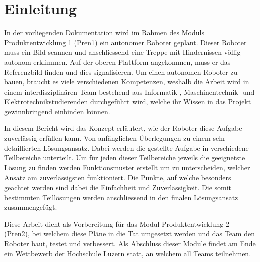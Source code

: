 \section{Einleitung}





In der vorliegenden Dokumentation wird im Rahmen des Moduls Produktentwicklung 1 (Pren1) ein autonomer Roboter geplant. Dieser Roboter muss ein Bild scannen und anschliessend eine Treppe mit Hindernissen völlig autonom erklimmen. Auf der oberen Plattform angekommen, muss er das Referenzbild finden und dies signalisieren.
Um einen autonomen Roboter zu bauen, braucht es viele verschiedenen Kompetenzen, weshalb die Arbeit wird in einem interdisziplinären Team bestehend aus Informatik-, Maschinentechnik- und Elektrotechnikstudierenden durchgeführt wird, welche ihr Wissen in das Projekt gewinnbringend einbinden können.

In diesem Bericht wird das Konzept erläutert, wie der Roboter diese Aufgabe zuverlässig erfüllen kann. Von anfänglichen Überlegungen zu einem sehr detaillierten Lösungsansatz. Dabei werden die gestellte Aufgabe in verschiedene Teilbereiche unterteilt. Um für jeden dieser Teilbereiche jeweils die geeignetste Lösung zu finden werden Funktionsmuster erstellt um zu unterscheiden, welcher Ansatz am zuverlässigsten funktioniert. Die Punkte, auf welche besonders geachtet werden sind dabei die Einfachheit und Zuverlässigkeit.
Die somit bestimmten Teillösungen werden anschliessend in den finalen Lösungsansatz zusammengefügt. 

Diese Arbeit dient als Vorbereitung für das Modul Produktentwicklung 2 (Pren2), bei welchem diese Pläne in die Tat umgesetzt werden und das Team den Roboter baut, testet und verbessert. Als Abschluss dieser Module findet am Ende ein Wettbewerb der Hochschule Luzern statt, an welchem all Teams teilnehmen.


